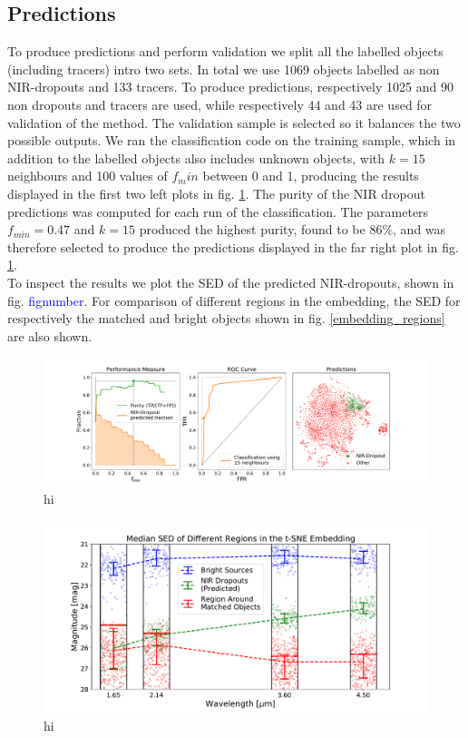 \subsection{Predictions}
To produce predictions and perform validation we split all the labelled objects (including tracers) intro two sets. In total we use 1069 objects labelled as non NIR-dropouts and 133 tracers. To produce predictions, respectively 1025 and 90 non dropouts and tracers are used, while respectively 44 and 43 are used for validation of the method. The validation sample is selected so it balances the two possible outputs. We ran the classification code on the training sample, which in addition to the labelled objects also includes unknown objects, with $k=15$ neighbours and 100 values of $f_min$ between 0 and 1, producing the results displayed in the first two left plots in fig. \ref{classification_plot}. The purity of the NIR dropout predictions was computed for each run of the classification. The parameters $f_{min}=0.47$ and $k=15$ produced the highest purity, found to be 86\%, and was therefore selected to produce the predictions displayed in the far right plot in fig. \ref{classification_plot}. \\

To inspect the results we plot the SED of the predicted NIR-dropouts, shown in fig. \textcolor{blue}{fignumber}. For comparison of different regions in the embedding, the SED for respectively the matched and bright objects shown in fig. \ref{embedding_regions} are also shown.

\begin{figure}[]
    \centering %
    \includegraphics[trim={3.5cm 0cm 4.5cm 0cm},clip,width=\textwidth]{Code/Saved_Figures/Classification_plot.pdf}
    \caption{hi}
    \label{classification_plot}
\end{figure}

\begin{figure}[]
    \centering %
    \includegraphics[trim={1cm 0cm 1cm 0cm},clip,width=\textwidth]{Code/Saved_Figures/SED_plot.pdf}
    \caption{hi}
    \label{SED}
\end{figure}


